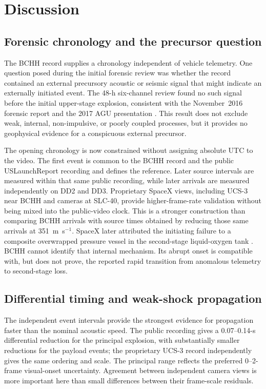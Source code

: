 \documentclass[]{seismica}
\begin{document}
\section{Discussion}
\label{sec:discussion}

\subsection{Forensic chronology and the precursor question}

The BCHH record supplies a chronology independent of vehicle telemetry. One
question posed during the initial forensic review was whether the record
contained an external precursory acoustic or seismic signal that might indicate
an externally initiated event. The 48-h six-channel review found no such signal
before the initial upper-stage explosion, consistent with the November~2016
forensic report \citep{thompson_mcnutt_fireball_2016} and the 2017 AGU
presentation \citep{thompson_agu_falcon9_2017}. This result does not exclude
weak, internal, non-impulsive, or poorly coupled processes, but it provides no
geophysical evidence for a conspicuous external precursor.

The opening chronology is now constrained without assigning absolute UTC to the
video. The first event is common to the BCHH record and the public
USLaunchReport recording and defines the reference. Later source intervals are
measured within that same public recording, while later arrivals are measured
independently on DD2 and DD3. Proprietary SpaceX views, including UCS-3 near
BCHH and cameras at SLC-40, provide higher-frame-rate validation without being
mixed into the public-video clock. This is a stronger construction than
comparing BCHH arrivals with source times obtained by reducing those same
arrivals at 351~m~s$^{-1}$. SpaceX later attributed the
initiating failure to a composite overwrapped pressure vessel in the
second-stage liquid-oxygen tank \citep{spacex_anomaly_2017,nasa_sma_falcon9}.
BCHH cannot identify that internal mechanism. Its abrupt onset is compatible
with, but does not prove, the reported rapid transition from anomalous telemetry
to second-stage loss.

\subsection{Differential timing and weak-shock propagation}

The independent event intervals provide the strongest evidence for
propagation faster than the nominal acoustic speed. The public recording gives
a 0.07--0.14-s differential reduction for the principal explosion, with
substantially smaller reductions for the payload events; the proprietary UCS-3
record independently gives the same ordering and scale. The principal range
reflects the preferred 0--2-frame visual-onset uncertainty. Agreement between
independent camera views is more important here than small differences between
their frame-scale residuals.
\end{document}
